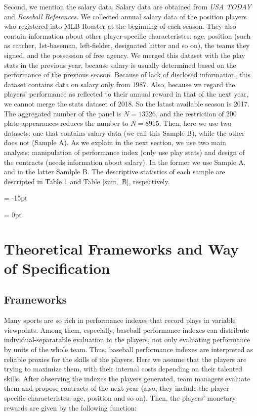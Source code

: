 \documentclass[dvipdfmx, 12pt]{article}
\begin{document}
Second, we mention the salary data. Salary data are obtained from \textit{USA TODAY} and \textit{Baseball References}. We collected annual salary data of the position players who registered into MLB Roaster at the beginning of each season. They also contain information about other player-specific characteristcs: age, position (such as catcher, 1st-baseman, left-fielder, designated hitter and so on), the teams they signed, and the possession of free agency. We merged this dataset with the play stats in the previous year, because salary is usually determined based on the performance of the previous season. Because of lack of disclosed information, this dataset contains data on salary only from 1987. Also, because we regard the players' performance as reflected to their annual reward in that of the next year, we cannot merge the stats dataset of 2018. So the latast available season is 2017. The aggregated number of the panel is $N=13226$, and the restriction of 200 plate-appearances reduces the number to $N=8915$. Then, here we  use two datasets: one that contains salary data (we call this Sample B), while the other does not (Sample A). As we explain in the next section, we use two main analysis: manipulation of performance index (only use play stats) and design of the contracts (needs information about salary). In the former we use Sample A, and in the latter Samlple B. The descriptive statistics of each sample are descripted in Table 1 and Table \ref{sum_B}, respectively.

\begin{table}
  
\end{table}

\leftskip = -15pt
\begin{table}
  
\end{table}
\leftskip = 0pt

\section{Theoretical Frameworks and Way of Specification}

\subsection{Frameworks}

Many sports are so rich in performance indexes that record plays in variable viewpoints. Among them, especially, baseball performance indexes can distribute individual-separatable evaluation to the players, not only evaluating performance by units of the whole team. Thus, baseball performance indexes are interpreted as reliable proxies for the skills of the players. Here we assume that the players are trying to maximize them, with their internal costs depending on their talented skills. After observing the indexes the players generated, team managers evaluate them and propose contracts of the next year (also, they include the player-specific characteristcs: age, position and so on). Then, the players' monetary rewards are given by the following function:
\end{document}

